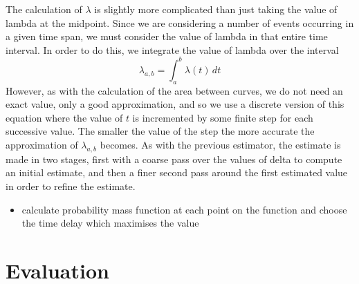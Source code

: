 \documentclass[a4paper,11pt]{article}
\begin{document}
The calculation of $\lambda$ is slightly more complicated than just taking the
value of lambda at the midpoint. Since we are considering a number of events
occurring in a given time span, we must consider the value of lambda in that
entire time interval. In order to do this, we integrate the value of lambda over
the interval
\begin{equation}
\lambda_{a,b}=\int_a^b\lambda(t)\,dt
\end{equation}
However, as with the calculation of the area between curves, we do not need an
exact value, only a good approximation, and so we use a discrete version of this
equation where the value of $t$ is incremented by some finite step for each successive
value. The smaller the value of the step the more accurate the approximation of
$\lambda_{a,b}$ becomes. As with the previous estimator, the estimate is made in
two stages, first with a coarse pass over the values of delta to compute an
initial estimate, and then a finer second pass around the first estimated value
in order to refine the estimate.
\begin{itemize}
\item calculate probability mass function at each point on the function and choose
  the time delay which maximises the value
\end{itemize}
\section{Evaluation}
\label{sec-7}
\end{document}

